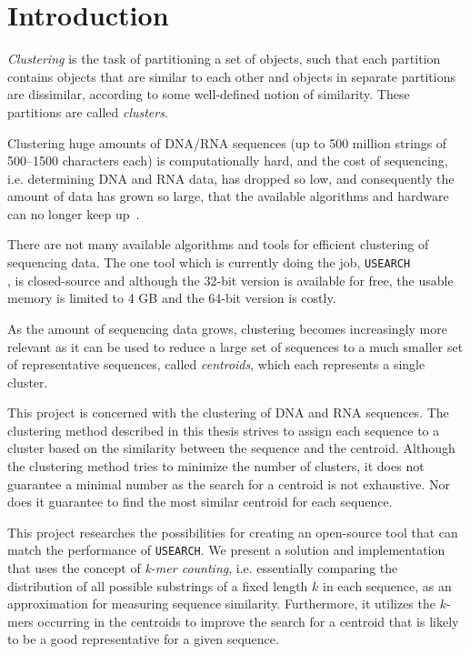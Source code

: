 \section{Introduction}
\label{sec:introduction}

\emph{Clustering} is the task of partitioning a set of objects, such that each
partition contains objects that are similar to each other and objects in
separate partitions are dissimilar, according to some well-defined notion of
similarity. These partitions are called \emph{clusters}.

Clustering huge amounts of DNA/RNA sequences (up to \num{500} million strings
of \num{500}--\num{1500} characters each) is computationally hard, and the cost
of sequencing, i.e. determining DNA and RNA data, has dropped so low, and
consequently the amount of data has grown so large, that the available
algorithms and hardware can no longer keep up~\cite{rothberg}.

There are not many available algorithms and tools for efficient clustering of
sequencing data. The one tool which is currently doing the job,
\texttt{USEARCH} \\ \cite{edgar,usearch}, is closed-source and although the
\num{32}-bit version is available for free, the usable memory is limited to
\num{4} GB and the \num{64}-bit version is costly.

As the amount of sequencing data grows, clustering becomes increasingly more
relevant as it can be used to reduce a large set of sequences to a much smaller
set of representative sequences, called \emph{centroids}, which each represents
a single cluster.

This project is concerned with the clustering of DNA and RNA sequences. The
clustering method described in this thesis strives to assign each sequence to
a cluster based on the similarity between the sequence and the centroid.
Although the clustering method tries to minimize the number of clusters, it
does not guarantee a minimal number as the search for a centroid is not
exhaustive. Nor does it guarantee to find the most similar centroid for each
sequence.

This project researches the possibilities for creating an open-source tool that
can match the performance of \texttt{USEARCH}. We present a solution and
implementation that uses the concept of \emph{k-mer counting}, i.e. essentially
comparing the distribution of all possible substrings of a fixed length $k$ in
each sequence, as an approximation for measuring sequence similarity.
Furthermore, it utilizes the $k$-mers occurring in the centroids to improve
the search for a centroid that is likely to be a good representative for a
given sequence.

